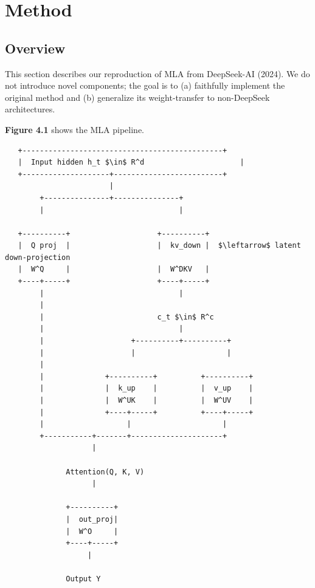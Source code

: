 
\section{Method}

\subsection{Overview}

This section describes our reproduction of MLA from DeepSeek-AI (2024). We 
do not introduce novel components; the goal is to (a) faithfully implement 
the original method and (b) generalize its weight-transfer to 
non-DeepSeek architectures.

\textbf{Figure 4.1} shows the MLA pipeline.

\begin{lstlisting}
   +----------------------------------------------+
   |  Input hidden h_t $\in$ R^d                      |
   +--------------------+-------------------------+
                        |
        +---------------+---------------+
        |                               |
                                         
   +----------+                    +----------+
   |  Q proj  |                    |  kv_down |  $\leftarrow$ latent down-projection
   |  W^Q     |                    |  W^DKV   |
   +----+-----+                    +----+-----+
        |                               |
        |                                
        |                          c_t $\in$ R^c
        |                               |
        |                    +----------+----------+
        |                    |                     |
        |                                           
        |              +----------+          +----------+
        |              |  k_up    |          |  v_up    |
        |              |  W^UK    |          |  W^UV    |
        |              +----+-----+          +----+-----+
        |                   |                     |
        +-----------+-------+---------------------+
                    |
                     
              Attention(Q, K, V)
                    |
                     
              +----------+
              |  out_proj|
              |  W^O     |
              +----+-----+
                   |
                    
              Output Y
\end{lstlisting}

